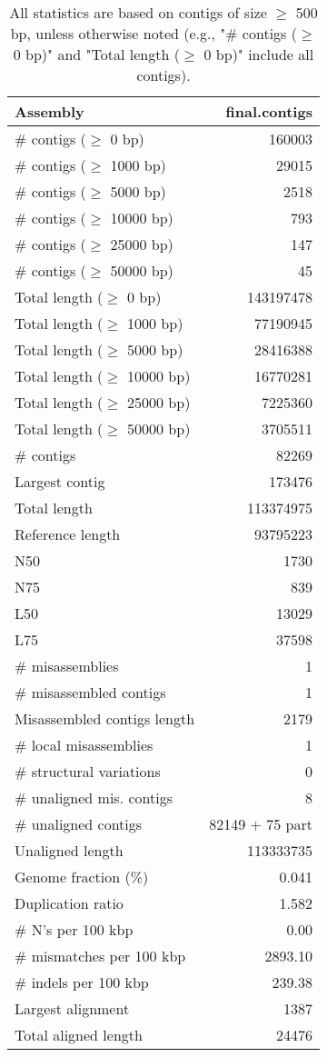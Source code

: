 \documentclass[12pt,a4paper]{article}
\begin{document}
\begin{table}[ht]
\begin{center}
\caption{All statistics are based on contigs of size $\geq$ 500 bp, unless otherwise noted (e.g., "\# contigs ($\geq$ 0 bp)" and "Total length ($\geq$ 0 bp)" include all contigs).}
\begin{tabular}{|l*{1}{|r}|}
\hline
Assembly & final.contigs \\ \hline
\# contigs ($\geq$ 0 bp) & 160003 \\ \hline
\# contigs ($\geq$ 1000 bp) & 29015 \\ \hline
\# contigs ($\geq$ 5000 bp) & 2518 \\ \hline
\# contigs ($\geq$ 10000 bp) & 793 \\ \hline
\# contigs ($\geq$ 25000 bp) & 147 \\ \hline
\# contigs ($\geq$ 50000 bp) & 45 \\ \hline
Total length ($\geq$ 0 bp) & 143197478 \\ \hline
Total length ($\geq$ 1000 bp) & 77190945 \\ \hline
Total length ($\geq$ 5000 bp) & 28416388 \\ \hline
Total length ($\geq$ 10000 bp) & 16770281 \\ \hline
Total length ($\geq$ 25000 bp) & 7225360 \\ \hline
Total length ($\geq$ 50000 bp) & 3705511 \\ \hline
\# contigs & 82269 \\ \hline
Largest contig & 173476 \\ \hline
Total length & 113374975 \\ \hline
Reference length & 93795223 \\ \hline
N50 & 1730 \\ \hline
N75 & 839 \\ \hline
L50 & 13029 \\ \hline
L75 & 37598 \\ \hline
\# misassemblies & 1 \\ \hline
\# misassembled contigs & 1 \\ \hline
Misassembled contigs length & 2179 \\ \hline
\# local misassemblies & 1 \\ \hline
\# structural variations & 0 \\ \hline
\# unaligned mis. contigs & 8 \\ \hline
\# unaligned contigs & 82149 + 75 part \\ \hline
Unaligned length & 113333735 \\ \hline
Genome fraction (\%) & 0.041 \\ \hline
Duplication ratio & 1.582 \\ \hline
\# N's per 100 kbp & 0.00 \\ \hline
\# mismatches per 100 kbp & 2893.10 \\ \hline
\# indels per 100 kbp & 239.38 \\ \hline
Largest alignment & 1387 \\ \hline
Total aligned length & 24476 \\ \hline
\end{tabular}
\end{center}
\end{table}
\end{document}
